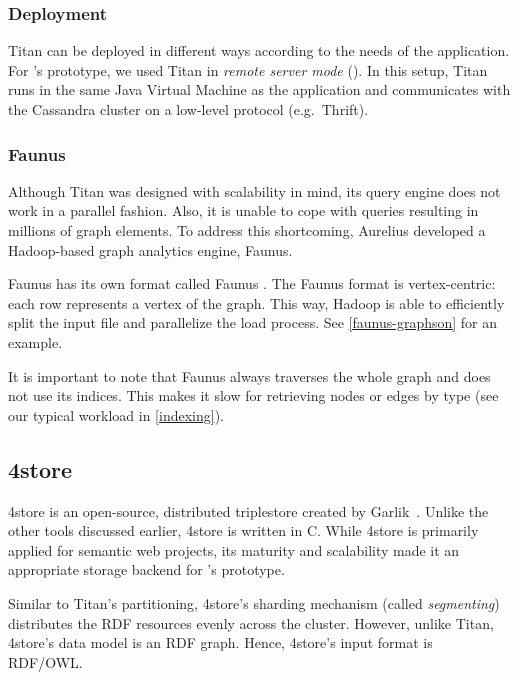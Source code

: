 
\subsubsection{Deployment}

Titan can be deployed in different ways according to the needs of the application. For \iqd's prototype, we used Titan in \textit{remote server mode} (). In this setup, Titan runs in the same Java Virtual Machine as the application and communicates with the Cassandra cluster on a low-level protocol (e.g.\ Thrift).


\subsubsection{Faunus}
\label{faunus}

Although Titan was designed with scalability in mind, its query engine does not work in a parallel fashion. Also, it is unable to cope with queries resulting in millions of graph elements. To address this shortcoming, Aurelius developed a Hadoop-based graph analytics engine, Faunus.

Faunus has its own format called Faunus \graphson{}. The Faunus \graphson{} format is vertex-centric: each row represents a vertex of the graph. This way, Hadoop is able to efficiently split the input file and parallelize the load process. See \autoref{faunus-graphson} for an example.

It is important to note that Faunus always traverses the whole graph and does not use its indices. This makes it slow for retrieving nodes or edges by type (see our typical workload in \autoref{indexing}).

\subsection{4store}
\label{4store}

4store is an open-source, distributed triplestore created by Garlik~\cite{4store}. Unlike the other tools discussed earlier, 4store is written in C. While 4store is primarily applied for semantic web projects, its maturity and scalability made it an appropriate storage backend for \iqd's prototype.

Similar to Titan's partitioning, 4store's sharding mechanism (called \emph{segmenting}) distributes the RDF resources evenly across the cluster. However, unlike Titan, 4store's data model is an RDF graph. Hence, 4store's input format is RDF/OWL.

